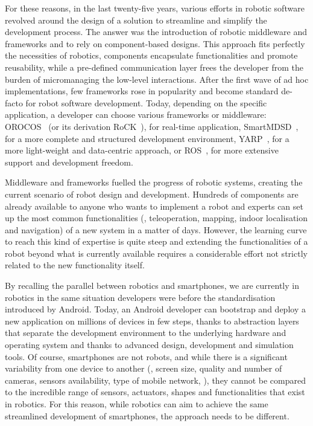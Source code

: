 For these reasons, in the last twenty-five years, various efforts in robotic software revolved around the design of a solution to streamline and simplify the development process. The answer was the introduction of robotic middleware and frameworks and to rely on component-based designs. This approach fits perfectly the necessities of robotics, components encapsulate functionalities and promote reusability, while a pre-defined communication layer frees the developer from the burden of micromanaging the low-level interactions. After the first wave of ad hoc implementations, few frameworks rose in popularity and become standard de-facto for robot software development. Today, depending on the specific application, a developer can choose various frameworks or middleware: OROCOS~\cite{bruyninckx2002orocos} (or its derivation RoCK~\cite{joyeux2011robot}), for real-time application, SmartMDSD~\cite{dennis2016smartmdsd}, for a more complete and structured development environment, YARP~\cite{metta2006yarp}, for a more light-weight and data-centric approach, or ROS~\cite{quigley2009ros}, for more extensive support and development freedom.

Middleware and frameworks fuelled the progress of robotic systems, creating the current scenario of robot design and development. Hundreds of components are already available to anyone who wants to implement a robot and experts can set up the most common functionalities (\ie, teleoperation, mapping, indoor localisation and navigation) of a new system in a matter of days. However, the learning curve to reach this kind of expertise is quite steep and extending the functionalities of a robot beyond what is currently available requires a considerable effort not strictly related to the new functionality itself.

By recalling the parallel between robotics and smartphones, we are currently in robotics in the same situation developers were before the standardisation introduced by Android. Today, an Android developer can bootstrap and deploy a new application on millions of devices in few steps, thanks to abstraction layers that separate the development environment to the underlying hardware and operating system and thanks to advanced design, development and simulation tools. Of course, smartphones are not robots, and while there is a significant variability from one device to another (\eg, screen size, quality and number of cameras, sensors availability, type of mobile network, \etc), they cannot be compared to the incredible range of sensors, actuators, shapes and functionalities that exist in robotics. For this reason, while robotics can aim to achieve the same streamlined development of smartphones, the approach needs to be different.

